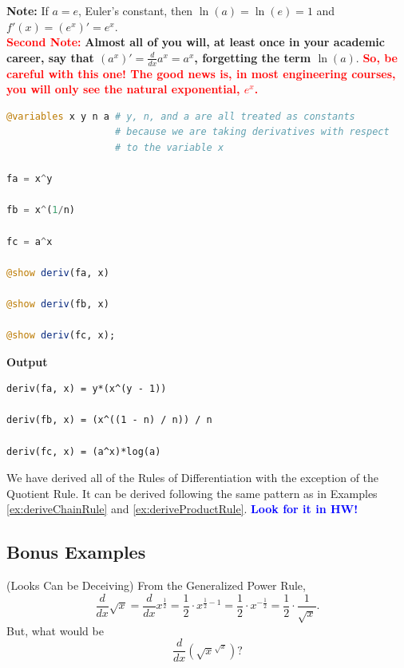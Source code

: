 \begin{enumerate}
     \textbf{Note:} If $a=e$, Euler's constant, then $\ln(a) = \ln(e) = 1$ and $f'(x) = \left(e^x \right)' = e^x.$ \\

     \textcolor{red}{\bf Second Note:} {\bf Almost all of you will, at least once in your academic career, say that $(a^x)' = \frac{d}{dx} a^x = a^x$, forgetting the term $\ln(a)$}.  \textcolor{red}{\bf So, be careful with this one! The good news is, in most engineering courses, you will only see the natural exponential, $e^x$.}
     
    \end{enumerate}

\begin{lstlisting}[language=Julia,style=mystyle]
@variables x y n a # y, n, and a are all treated as constants
                   # because we are taking derivatives with respect
                   # to the variable x

fa = x^y

fb = x^(1/n)

fc = a^x

@show deriv(fa, x)

@show deriv(fb, x)

@show deriv(fc, x);
\end{lstlisting}
\textbf{Output} 
\begin{verbatim}
deriv(fa, x) = y*(x^(y - 1))

deriv(fb, x) = (x^((1 - n) / n)) / n

deriv(fc, x) = (a^x)*log(a)
\end{verbatim}
    \Qed

    \vspace*{.2cm}

\begin{rem} We have derived all of the Rules of Differentiation with the exception of the Quotient Rule. It can be derived following the same pattern as in Examples \ref{ex:deriveChainRule}
and \ref{ex:deriveProductRule}. \textcolor{blue}{\bf Look for it in HW!} 
\end{rem} 


\subsection{Bonus Examples}

  \begin{example} (Looks Can be Deceiving) From the Generalized Power Rule, 
  $$ \frac{d}{dx}\sqrt{x} =\frac{d}{dx} x^{\frac{1}{2}} = \frac{1}{2} \cdot x^{\frac{1}{2} -1}  = \frac{1}{2} \cdot x^{-\frac{1}{2}} =  \frac{1}{2} \cdot \frac{1}{\sqrt{x}}.$$ 
  But, what would be 
  $$\frac{d}{dx}\left( \sqrt{x}^{\sqrt{x}} \right)?$$       
  \end{example}

